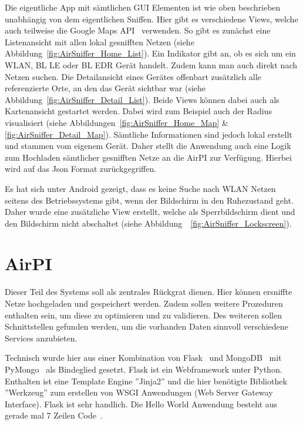 \documentclass[11pt,a4paper]{article}
\begin{document}
Die eigentliche App mit sämtlichen GUI Elementen ist wie oben beschrieben unabhängig von dem eigentlichen Sniffen. Hier gibt es verschiedene Views, welche auch teilweise die Google Maps API~\cite{googlemapsapi} verwenden.
So gibt es zunächst eine Listenansicht mit allen lokal gesnifften Netzen (siehe Abbildung~\ref{fig:AirSniffer_Home_List}). 
Ein Indikator gibt an, ob es sich um ein WLAN, BL LE oder BL EDR Gerät handelt. Zudem kann man auch direkt nach Netzen suchen. Die Detailansicht eines Gerätes offenbart zusätzlich alle referenzierte Orte, an den das Gerät sichtbar war (siehe Abbildung~\ref{fig:AirSniffer_Detail_List}). 
Beide Views können dabei auch als Kartenansicht gestartet werden. Dabei wird zum Beispiel auch der Radius visualisiert 
(siehe Abbildungen~\ref{fig:AirSniffer_Home_Map} \& \ref{fig:AirSniffer_Detail_Map}). Sämtliche Informationen sind jedoch lokal erstellt und stammen vom eigenem Gerät. Daher stellt die Anwendung auch eine Logik zum Hochladen sämtlicher gesnifften Netze an die AirPI zur Verfügung. Hierbei wird auf das Json Format zurückgegriffen. 

Es hat sich unter Android gezeigt, dass es keine Suche nach WLAN Netzen seitens des Betriebssystems gibt, wenn der Bildschirm in den Ruhezustand geht. Daher wurde eine zusätzliche View erstellt, welche als Sperrbildschirm dient und den Bildschirm nicht abschaltet (siehe Abbildung~~\ref{fig:AirSniffer_Lockscreen}).


\section{AirPI}

Dieser Teil des Systems soll als zentrales Rückgrat dienen. Hier können ersniffte Netze hochgeladen und gespeichert werden. Zudem sollen weitere Prozeduren enthalten sein, um diese zu optimieren und zu validieren. 
Des weiteren sollen Schnittstellen gefunden werden, um die vorhanden Daten sinnvoll  verschiedene Services anzubieten.

Technisch wurde hier aus einer Kombination von Flask~\cite{flask} und MongoDB~\cite{mongodb} mit PyMongo~\cite{pymongo} als Bindeglied gesetzt. Flask ist ein Webframework unter Python. Enthalten ist eine Template Engine ''Jinja2'' und die hier benötigte Bibliothek ''Werkzeug'' zum erstellen von WSGI Anwendungen (Web Server Gateway Interface). Flask ist sehr handlich. Die Hello World Anwendung besteht aus gerade mal 7 Zeilen Code~\cite{flask}.
\end{document}
